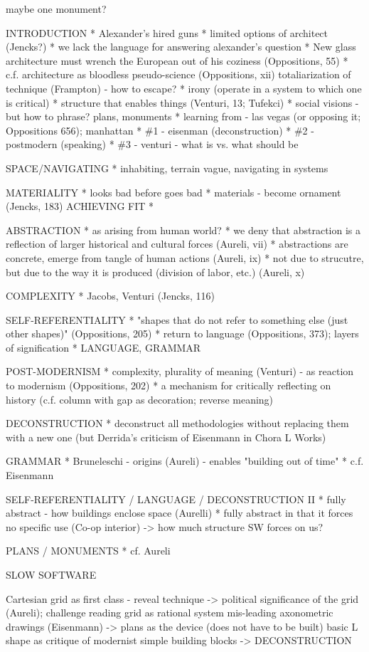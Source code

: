 maybe one monument?

INTRODUCTION
* Alexander's hired guns
* limited options of architect (Jencks?)
* we lack the language for answering alexander's question
* New glass architecture must wrench the European out of his coziness (Oppositions, 55)
* c.f. architecture as bloodless pseudo-science (Oppositions, xii)
  totaliarization of technique (Frampton) - how to escape?
* irony (operate in a system to which one is critical)
* structure that enables things (Venturi, 13; Tufekci)
* social visions - but how to phrase? plans, monuments
* learning from - las vegas (or opposing it; Oppositions 656); manhattan
* \#1 - eisenman (deconstruction)
* \#2 - postmodern (speaking)
* \#3 - venturi - what is vs. what should be



SPACE/NAVIGATING
* inhabiting, terrain vague, navigating in systems

MATERIALITY
* looks bad before goes bad
* materials - become ornament (Jencks, 183)
ACHIEVING FIT
*

ABSTRACTION
* as arising from human world?
* we deny that abstraction is a reflection of larger historical and cultural forces (Aureli, vii)
* abstractions are concrete, emerge from tangle of human actions (Aureli, ix)
* not due to strucutre, but due to the way it is produced (division of labor, etc.) (Aureli, x)

COMPLEXITY
* Jacobs, Venturi (Jencks, 116)

SELF-REFERENTIALITY
* "shapes that do not refer to something else (just other shapes)" (Oppositions, 205)
* return to language (Oppositions, 373); layers of signification
* LANGUAGE, GRAMMAR

POST-MODERNISM
* complexity, plurality of meaning (Venturi) - as reaction to modernism (Oppositions, 202)
* a mechanism for critically reflecting on history
  (c.f. column with gap as decoration; reverse meaning)

DECONSTRUCTION
* deconstruct all methodologies without replacing them with a new one
  (but Derrida's criticism of Eisenmann in Chora L Works)

GRAMMAR
* Bruneleschi - origins (Aureli) - enables "building out of time"
* c.f. Eisenmann

SELF-REFERENTIALITY / LANGUAGE / DECONSTRUCTION II
* fully abstract - how buildings enclose space (Aurelli)
* fully abstract in that it forces no specific use (Co-op interior)
-> how much structure SW forces on us?

PLANS / MONUMENTS
* cf. Aureli


SLOW SOFTWARE

Cartesian grid as first class - reveal technique
-> political significance of the grid (Aureli); challenge reading grid as rational system
mis-leading axonometric drawings (Eisenmann)
-> plans as the device (does not have to be built)
basic L shape as critique of modernist simple building blocks
-> DECONSTRUCTION

\theendnotes
